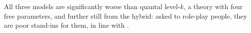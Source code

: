 All three models are significantly worse than quantal level-$k$, a theory with four free parameters, and further still from the hybrid: asked to role-play people, they are poor stand-ins for them, in line with \citet{wang2026discovering}.
